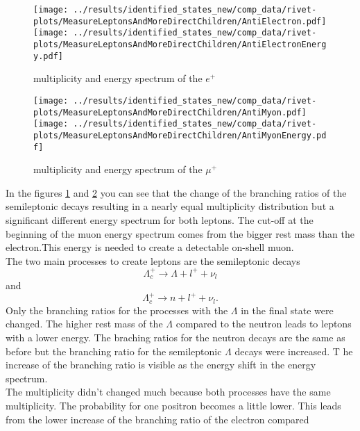 \begin{figure}[h]
  \centering
  \texttt{[image: ../results/identified\_states\_new/comp\_data/rivet-plots/MeasureLeptonsAndMoreDirectChildren/AntiElectron.pdf]}
  \texttt{[image: ../results/identified\_states\_new/comp\_data/rivet-plots/MeasureLeptonsAndMoreDirectChildren/AntiElectronEnergy.pdf]}
  \caption{multiplicity and energy spectrum of the \(e^+\)} \label{gr:prim-ep}
\end{figure}
\begin{figure}[h]
  \centering
  \texttt{[image: ../results/identified\_states\_new/comp\_data/rivet-plots/MeasureLeptonsAndMoreDirectChildren/AntiMyon.pdf]}
  \texttt{[image: ../results/identified\_states\_new/comp\_data/rivet-plots/MeasureLeptonsAndMoreDirectChildren/AntiMyonEnergy.pdf]}
  \caption{multiplicity and energy spectrum of the \(\mu^+\)} \label{gr:prim-mup}
\end{figure}
In the figures {\ref{gr:prim-ep}} and {\ref{gr:prim-mup}} you can see that 
the change of the branching ratios of the semileptonic decays 
resulting in a nearly equal multiplicity distribution but a significant different 
energy spectrum for both leptons. The cut-off at the beginning of the muon 
energy spectrum comes from the bigger rest mass than the electron.This energy is 
needed to create a detectable on-shell muon.\\
The two main processes to create leptons are the semileptonic decays
\begin{equation}
  \Lambda_c^+ \rightarrow \Lambda + l^+ + \nu_l \nonumber
\end{equation} and 
\begin{equation}
  \Lambda_c^+ \rightarrow n+ l^+ + \nu_l. \nonumber
\end{equation}
Only the branching ratios for the processes with the \(\Lambda\) in the final state were changed. 
The higher rest mass of the \(\Lambda\) compared to the neutron leads to leptons 
with a lower energy. The braching ratios for the neutron decays are the same as 
before but the branching ratio for the semileptonic \(\Lambda\) decays were increased. T
he increase of the branching ratio is visible as the energy shift in the energy spectrum.\\
The multiplicity didn't changed much because both processes have the same 
multiplicity. The probability for one positron becomes a little lower. This 
leads from the lower increase of the branching ratio of the electron compared 
